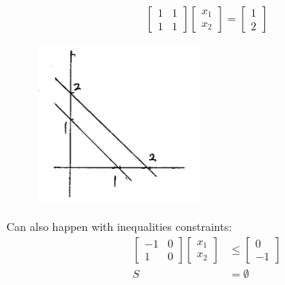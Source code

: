 \begin{example}
	\begin{equation*}
	\begin{bmatrix}
	1&1\\
	1&1
	\end{bmatrix}
	\begin{bmatrix}
	x_1\\
	x_2
	\end{bmatrix}=
	\begin{bmatrix}
	1\\
	2
	\end{bmatrix}
	\end{equation*}
	
	\begin{figure}
	\centering
	\includegraphics[width=2.1in,height=2.1in]{figures/ch07/figure1012_4.png}
	\end{figure}
	
	Can also happen with inequalities constraints:
		\begin{align*}
	\begin{bmatrix}
	-1&0\\
	1&0
	\end{bmatrix}
	\begin{bmatrix}
	x_1\\
	x_2
	\end{bmatrix}&\leq
	\begin{bmatrix}
	0\\
	-1
	\end{bmatrix}\\
	S &= \emptyset
	\end{align*}

\end{example}



